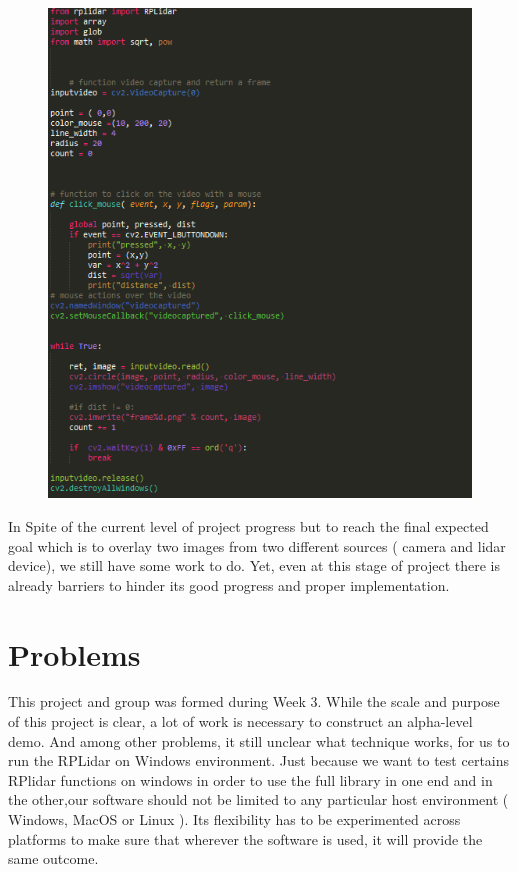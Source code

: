 \documentclass[onecolumn, draftclsnofoot,10pt, compsoc]{IEEEtran}
\begin{document}
\begin{singlespace}
			\begin{figure}[here]
				\includegraphics[scale=0.4, width=\textwidth]{videocapture.png}
				\label{videocapture}
			\end{figure}
			
	In Spite of the current level of project progress but  to reach the final expected goal which is to overlay two images from two different sources ( camera and lidar device), we still have some work to do. Yet, even at this stage of project there is already barriers to hinder its good progress and  proper implementation. 

		\section{Problems}
		This project and group was formed during Week 3. While the scale and purpose of this project is clear, a lot of work is necessary to construct an alpha-level demo. And among other problems, it still unclear what technique works, for us to run the RPLidar on Windows environment. Just because we want to test certains RPlidar functions on windows in order to use the full library in one end and in the other,our software should not be limited to any particular host environment ( Windows, MacOS or Linux ). Its  flexibility has to be experimented across platforms to make sure that wherever the software is used, it will provide the same outcome.




\end{singlespace}
\end{document}
